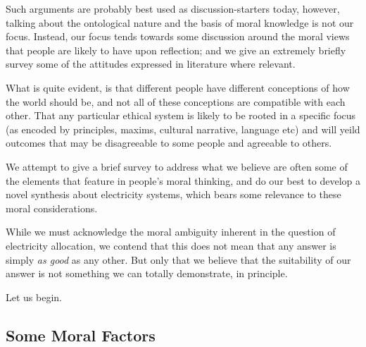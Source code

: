 Such arguments are probably best used as discussion-starters today, however, talking about the ontological nature and the basis of moral knowledge is not our focus.
Instead, our focus tends towards some discussion around the moral views that people are likely to have upon reflection; and we give an extremely briefly survey some of the attitudes expressed in literature where relevant.

What is quite evident, is that different people have different conceptions of how the world should be, and not all of these conceptions are compatible with each other.
That any particular ethical system is likely to be rooted in a specific focus (as encoded by principles, maxims, cultural narrative, language etc) and will yeild outcomes that may be disagreeable to some people and agreeable to others.


We attempt to give a brief survey to address what we believe are often some of the elements that feature in people's moral thinking, and do our best to develop a novel synthesis about electricity systems, which bears some relevance to these moral considerations.

While we must acknowledge the moral ambiguity inherent in the question of electricity allocation, we contend that this does not mean that any answer is simply \textit{as good} as any other. But only that we believe that the suitability of our answer is not something we can totally demonstrate, in principle.

Let us begin.

\subsection{Some Moral Factors}

